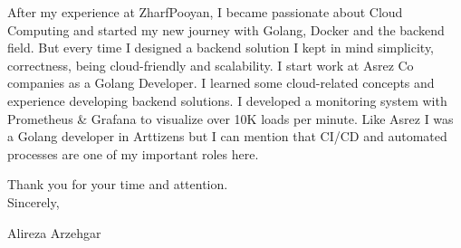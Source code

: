 \documentclass{coverletter}
\begin{document}
After my experience at ZharfPooyan, I became passionate about Cloud Computing and started my new journey
with Golang, Docker and the backend field. But every time I designed a backend solution
I kept in mind simplicity, correctness, being cloud-friendly and scalability.
I start work at Asrez Co companies as a Golang Developer. I learned some cloud-related
concepts and experience developing backend solutions. I developed a monitoring system with
Prometheus \& Grafana to visualize over 10K loads per minute.
Like Asrez I was a Golang developer in Arttizens but I can mention that CI/CD and automated processes are one of my
important roles here.
\\

\setlength{\parindent}{0pt}

Thank you for your time and attention.
\\

Sincerely,

Alireza Arzehgar
\end{document}
